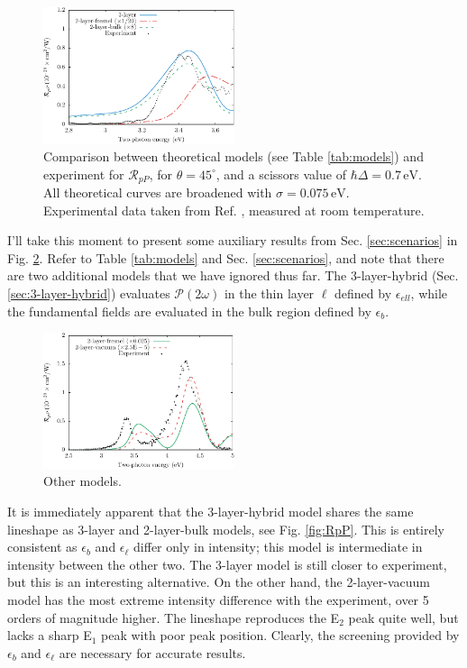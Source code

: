 \begin{figure}[H]
\centering
\includegraphics[width=0.5\textwidth]{content/figures/fig-4_4_06}
\caption{Comparison between theoretical models (see Table \ref{tab:models}) and
experiment for $\mathcal{R}_{pP}$, for $\theta=45^{\circ}$, and a scissors
value of $\hbar\Delta = 0.7\,\text{eV}$. All theoretical curves are broadened
with $\sigma=0.075\,\text{eV}$. Experimental data taken from Ref.
\cite{mitchellSS01}, measured at room temperature.}
\label{fig:mitchellRpP}
\end{figure}

I'll take this moment to present some auxiliary results from Sec.
\ref{sec:scenarios} in Fig. \ref{fig:othermodels}. Refer to Table
\ref{tab:models} and Sec. \ref{sec:scenarios}, and note that there are two
additional models that we have ignored thus far. The 3-layer-hybrid (Sec.
\ref{sec:3-layer-hybrid}) evaluates $\mathcal{P}(2\omega)$ in the thin layer
$\ell$ defined by $\epsilon_{ell}$, while the fundamental fields are evaluated
in the bulk region defined by $\epsilon_{b}$.

\begin{figure}[H]
\centering 
\includegraphics[width=0.5\textwidth]{content/figures/fig-Si1x1-Mejia_RpP_models}
\caption{Other models. \label{fig:othermodels}}
\end{figure}

It is immediately apparent that the 3-layer-hybrid model shares the same
lineshape as 3-layer and 2-layer-bulk models, see Fig. \ref{fig:RpP}. This is
entirely consistent as $\epsilon_{b}$ and $\epsilon_{\ell}$ differ only in
intensity; this model is intermediate in intensity between the other two. The
3-layer model is still closer to experiment, but this is an interesting
alternative. On the other hand, the 2-layer-vacuum model has the most extreme
intensity difference with the experiment, over 5 orders of magnitude higher. The
lineshape reproduces the E$_{2}$ peak quite well, but lacks a sharp E$_{1}$ peak
with poor peak position. Clearly, the screening provided by $\epsilon_{b}$ and
$\epsilon_{\ell}$ are necessary for accurate results.

